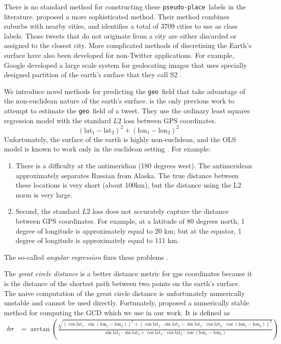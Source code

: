 \documentclass[sigconf,10pt]{acmart}
\newcommand{\tweetdata}[1]{{\texttt{#1}~}}
\newcommand{\pseudoplace  }{\tweetdata{pseudo-place}}
\newcommand{\geo          }{\tweetdata{geo}}
\newcommand{\lata}{\text{lat}_1}
\newcommand{\latb}{\text{lat}_2}
\newcommand{\latd}{(\lata-\latb)}
\newcommand{\lona}{\text{lon}_1}
\newcommand{\lonb}{\text{lon}_2}
\newcommand{\lond}{(\lona-\lonb)}
\begin{document}
There is no standard method for constructing these \pseudoplace labels in the literature.
\citet{han2012geolocation} proposed a more sophisticated method.
Their method combines suburbs with nearby cities,
and identifies a total of 3709 cities to use as class labels.
Those tweets that do not originate from a city are either discarded or assigned to the closest city.
More complicated methods of discretizing the Earth's surface have also been developed for non-Twitter applications.
For example, Google developed a large scale system for geolocating images that uses specially designed partition of the earth's surface that they call S2 \citep{weyand2016planet}.

We introduce novel methods for predicting the \geo field that take advantage of the non-euclidean nature of the earth's surface.
\citet{duong2016near} is the only previous work to attempt to estimate the \geo field of a tweet.
They use the ordinary least squares regression model with the standard $L2$ loss between GPS coordinates.
\begin{equation}
    \latd^2 + \lond^2
\end{equation}
Unfortunately, the surface of the earth is highly non-euclidean, 
and the OLS model is known to work only in the euclidean setting \citep[e.g.][]{fisher1992regression}.
For example:
\begin{enumerate}
    \item
        There is a difficulty at the antimeridian (180 degrees west).
        The antimeridean approximately separates Russian from Alaska.
        The true distance between these locations is very short (about 100km),
        but the distance using the L2 norm is very large.
    \item
        Second, the standard $L2$ loss does not accurately capture the distance between GPS coordinates.
        For example, at a latitude of 80 degrees north, 1 degree of longitude is approximately equal to 20 km;
        but at the equator, 1 degree of longitude is approximately equal to 111 km.
\end{enumerate}

The so-called \emph{angular regression} fixes these problems \citep{fisher1992regression}.

The \emph{great circle distance} is a better distance metric for gps coordinates because it is the distance of the shortest path between two points on the earth's surface.
The naive computation of the great circle distance is unfortunately numerically unstable and cannot be used directly.
Fortunately, \citet{vincenty1975direct} proposed a numerically stable method for computing the GCD which we use in our work.
It is defined as
\begin{align}
    \delta\sigma 
    &=
    \arctan\left(
        \frac
        {\sqrt{(\cos\lata\cdot\sin\lond)^2 + (\cos\lata\cdot\sin\latb-\sin\lata\cdot\cos\latb\cdot\cos\lond)^2}}
        {\sin\lata\cdot\sin\latb + \cos\lata\cdot\cos\latb\cdot\cos\lond}
    \right)
\end{align}
\end{document}
